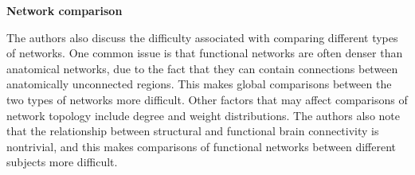 \documentclass[11pt, letterpaper]{article}
\begin{document}
\noindent\textbf{Network comparison}

The authors also discuss the difficulty associated with comparing different types of networks. One common issue is that 
functional networks are often denser than anatomical networks, due to the fact that they can contain connections between 
anatomically unconnected regions. This makes global comparisons between the two types of networks more difficult. Other 
factors that may affect comparisons of network topology include degree and weight distributions. The authors also 
note that the relationship between structural and functional brain connectivity is nontrivial, and this makes 
comparisons of functional networks between different subjects more difficult.
\end{document}
